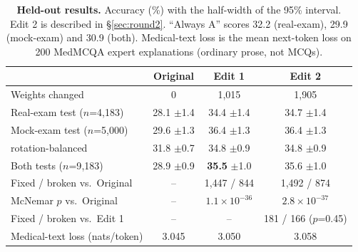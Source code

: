 \begin{table}[t]
\centering\small
\caption{\textbf{Held-out results.} Accuracy (\%) with the half-width of the 95\% interval. Edit 2 is described in \S\ref{sec:round2}. ``Always A'' scores 32.2 (real-exam), 29.9 (mock-exam) and 30.9 (both). Medical-text loss is the mean next-token loss on 200 MedMCQA expert explanations (ordinary prose, not MCQs).}
\label{tab:main}
\begin{tabular}{lccc}
\toprule
 & Original & Edit 1 & Edit 2 \\
\midrule
Weights changed & 0 & 1{,}015 & 1{,}905 \\
Real-exam test ($n$=4{,}183) & 28.1 {\scriptsize$\pm$1.4} & 34.4 {\scriptsize$\pm$1.4} & 34.7 {\scriptsize$\pm$1.4} \\
Mock-exam test ($n$=5{,}000) & 29.6 {\scriptsize$\pm$1.3} & 36.4 {\scriptsize$\pm$1.3} & 36.4 {\scriptsize$\pm$1.3} \\
\quad rotation-balanced & 31.8 {\scriptsize$\pm$0.7} & 34.8 {\scriptsize$\pm$0.9} & 34.8 {\scriptsize$\pm$0.9} \\
Both tests ($n$=9{,}183) & 28.9 {\scriptsize$\pm$0.9} & \textbf{35.5} {\scriptsize$\pm$1.0} & 35.6 {\scriptsize$\pm$1.0} \\
\midrule
Fixed / broken vs.\ Original & -- & 1{,}447 / 844 & 1{,}492 / 874 \\
McNemar $p$ vs.\ Original & -- & $1.1\times10^{-36}$ & $2.8\times10^{-37}$ \\
Fixed / broken vs.\ Edit 1 & -- & -- & 181 / 166 ($p$=0.45) \\
Medical-text loss (nats/token) & 3.045 & 3.050 & 3.058 \\
\bottomrule
\end{tabular}
\end{table}
